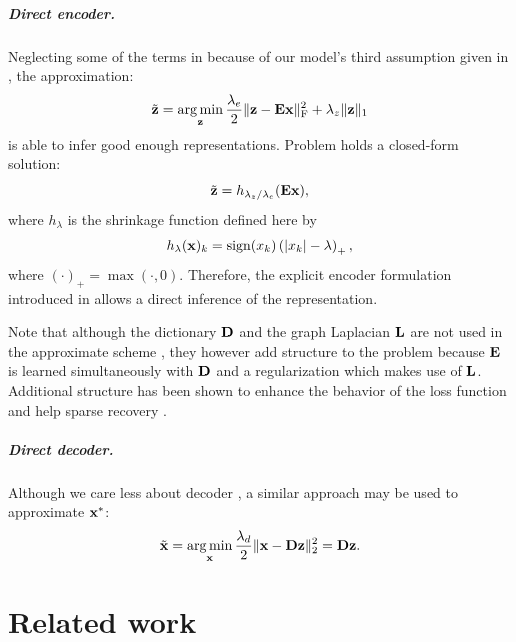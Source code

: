 \paragraph{Direct encoder.}
Neglecting some of the terms in  because of our model's third assumption given in , the approximation:
\begin{equation} \label{eqn:z_approximate}
	\tilde{\mathbf{z}} = \operatorname*{arg\,min}\limits_{\mathbf{z}} \frac{\lambda_e}{2} \| \mathbf{z} - \mathbf{E} \mathbf{x} \|_\text{F}^2 + \lambda_z \| \mathbf{z} \|_1
\end{equation}
is able to infer good enough representations. Problem  holds a closed-form solution:
\begin{equation} \label{eqn:z_direct}
	\tilde{\mathbf{z}} = h_{\lambda_z / \lambda_e} (\mathbf{E} \mathbf{x}),
\end{equation}
where $h_\lambda$ is the shrinkage function defined here by
\begin{equation} \label{eqn:shrinkage}
	h_\lambda(\mathbf{x})_k = \operatorname*{sign}(x_k) \left( |x_k| - \lambda \right)_+ ,
\end{equation}
where $(\cdot)_+ = \max(\cdot, 0)$. Therefore, the explicit encoder formulation introduced in  allows a direct inference of the representation.

Note that although the dictionary $\mathbf{D}$ and the graph Laplacian $\mathbf{L}$ are not used in the approximate scheme , they however add structure to the problem because $\mathbf{E}$ is learned simultaneously with $\mathbf{D}$ and a regularization which makes use of $\mathbf{L}$. Additional structure has been shown to enhance the behavior of the loss function and help sparse recovery \cite{kowalski2009sparse, baraniuk2010modelCS, huang2011LearningStructuredSparsity, jenatton2011structured}.

\paragraph{Direct decoder.}
Although we care less about decoder , a similar approach may be used to approximate $\mathbf{x}^*$:
\begin{equation} \label{eqn:x_direct}
	\tilde{\mathbf{x}} = \operatorname*{arg\,min}\limits_{\mathbf{x}} \frac{\lambda_d}{2} \| \mathbf{x} - \mathbf{D} \mathbf{z} \|_2^2 = \mathbf{D} \mathbf{z}.
\end{equation}

\chapter{Related work}


